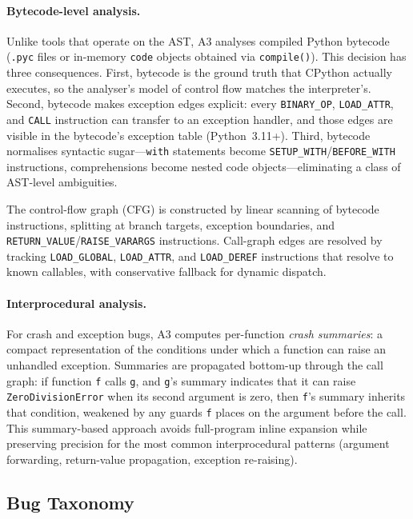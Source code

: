 \documentclass[sigconf,review,anonymous]{acmart}
\begin{document}
\paragraph{Bytecode-level analysis.}
Unlike tools that operate on the AST, \textsc{A3} analyses compiled Python bytecode (\texttt{.pyc} files or in-memory \texttt{code} objects obtained via \texttt{compile()}).
This decision has three consequences.
First, bytecode is the ground truth that CPython actually executes, so the analyser's model of control flow matches the interpreter's.
Second, bytecode makes exception edges explicit: every \texttt{BINARY\_OP}, \texttt{LOAD\_ATTR}, and \texttt{CALL} instruction can transfer to an exception handler, and those edges are visible in the bytecode's exception table (Python~3.11+).
Third, bytecode normalises syntactic sugar---\texttt{with} statements become \texttt{SETUP\_WITH}/\texttt{BEFORE\_WITH} instructions, comprehensions become nested code objects---eliminating a class of AST-level ambiguities.

The control-flow graph (CFG) is constructed by linear scanning of bytecode instructions, splitting at branch targets, exception boundaries, and \texttt{RETURN\_VALUE}/\texttt{RAISE\_VARARGS} instructions.
Call-graph edges are resolved by tracking \texttt{LOAD\_GLOBAL}, \texttt{LOAD\_ATTR}, and \texttt{LOAD\_DEREF} instructions that resolve to known callables, with conservative fallback for dynamic dispatch.

\paragraph{Interprocedural analysis.}
For crash and exception bugs, \textsc{A3} computes per-function \emph{crash summaries}: a compact representation of the conditions under which a function can raise an unhandled exception.
Summaries are propagated bottom-up through the call graph: if function \texttt{f} calls \texttt{g}, and \texttt{g}'s summary indicates that it can raise \texttt{ZeroDivisionError} when its second argument is zero, then \texttt{f}'s summary inherits that condition, weakened by any guards \texttt{f} places on the argument before the call.
This summary-based approach avoids full-program inline expansion while preserving precision for the most common interprocedural patterns (argument forwarding, return-value propagation, exception re-raising).

\subsection{Bug Taxonomy}
\end{document}
